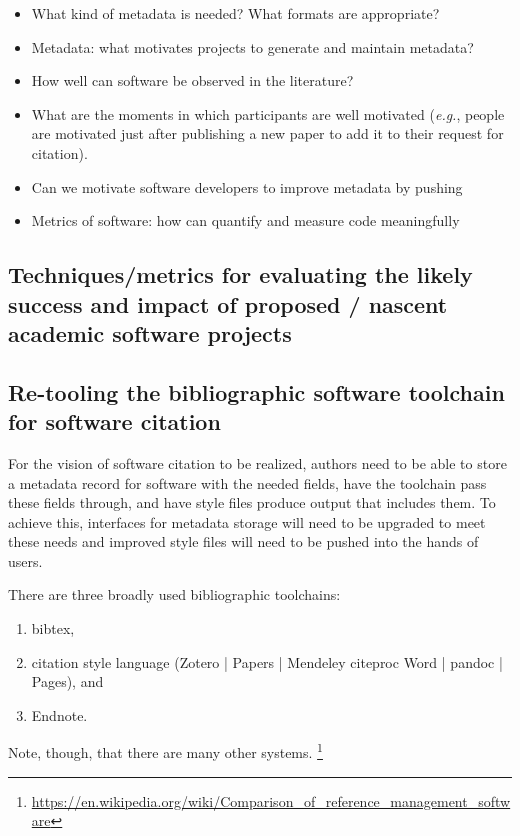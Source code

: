 \documentclass[a4paper,UKenglish]{dagman}
\newcommand{\eg}{\emph{e.g.},\xspace}
\begin{document}
\begin{itemize}
\item What kind of metadata is needed? What formats are appropriate?
\item Metadata: what motivates projects to generate and maintain metadata?
\item How well can software be observed in the literature?
\item What are the moments in which participants are well motivated (\eg people are motivated just after publishing a new paper to add it to their request for citation).
\item Can we motivate software developers to improve metadata by pushing 
\item Metrics of software: how can quantify and measure code meaningfully
\end{itemize}

\subsection{Techniques/metrics for evaluating the likely success and impact of proposed / nascent academic software projects}

\subsection{Re-tooling the bibliographic software toolchain for software citation}

For the vision of software citation to be realized, authors need to be able to store a metadata record for software with the needed fields, have the toolchain pass these fields through, and have style files produce output that includes them. To achieve this, interfaces for metadata storage will need to be upgraded to meet these needs and improved style files will need to be pushed into the hands of users.

There are three broadly used bibliographic toolchains:
\begin{enumerate}
\item bibtex, 
\item citation style language (Zotero | Papers | Mendeley \ra citeproc \ra Word | pandoc | Pages),  and \item Endnote.
\end{enumerate}
Note, though, that there are many other systems.%
\footnote{\url{https://en.wikipedia.org/wiki/Comparison_of_reference_management_software}}
\end{document}
